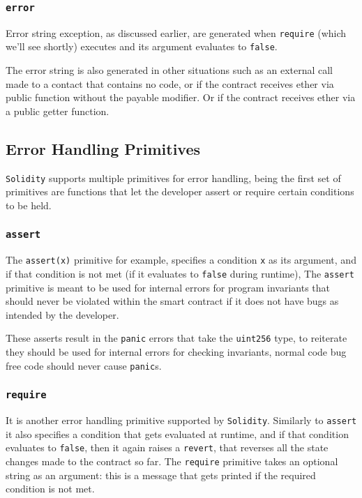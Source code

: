 \subsubsection{\texorpdfstring{\texttt{error}}{error}}\label{error}

Error string exception, as discussed earlier, are generated when
\texttt{require} (which we'll see shortly) executes and its argument
evaluates to \texttt{false}.

The error string is also generated in other situations such as an
external call made to a contact that contains no code, or if the
contract receives ether via public function without the payable
modifier. Or if the contract receives ether via a public getter
function.

\subsection{Error Handling Primitives}\label{error-handling-primitives}

\texttt{Solidity} supports multiple primitives for error handling, being
the first set of primitives are functions that let the developer assert
or require certain conditions to be held.

\subsubsection{\texorpdfstring{\texttt{assert}}{assert}}\label{assert}

The \texttt{assert(x)} primitive for example, specifies a condition
\texttt{x} as its argument, and if that condition is not met (if it
evaluates to \texttt{false} during runtime), The \texttt{assert}
primitive is meant to be used for internal errors for program invariants
that should never be violated within the smart contract if it does not
have bugs as intended by the developer.

These asserts result in the \texttt{panic} errors that take the
\texttt{uint256} type, to reiterate they should be used for internal
errors for checking invariants, normal code bug free code should never
cause \texttt{panic}s.

\subsubsection{\texorpdfstring{\texttt{require}}{require}}\label{require}

It is another error handling primitive supported by \texttt{Solidity}.
Similarly to \texttt{assert} it also specifies a condition that gets
evaluated at runtime, and if that condition evaluates to \texttt{false},
then it again raises a \texttt{revert}, that reverses all the state
changes made to the contract so far. The \texttt{require} primitive
takes an optional string as an argument: this is a message that gets
printed if the required condition is not met.

